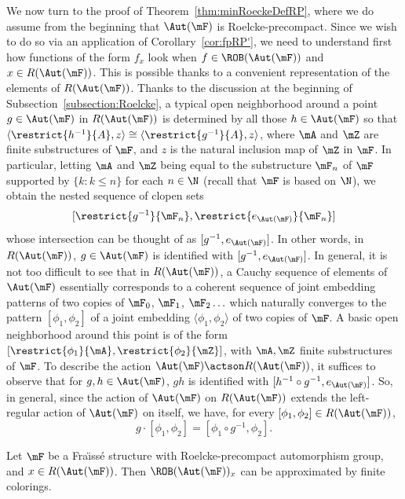 We now turn to the proof of Theorem~\ref{thm:minRoeckeDefRP}, where we do assume from the beginning that $\Aut(\mF)$ is Roelcke-precompact. Since we wish to do so via an application of Corollary~\ref{cor:fpRP'}, we need to understand first how functions of the form $f_{x}$ look when $f\in \ROB(\Aut(\mF))$ and $x\in R(\Aut(\mF))$. This is possible thanks to a convenient representation of the elements of $R(\Aut(\mF))$. Thanks to the discussion at the beginning of Subsection~\ref{subsection:Roelcke}, a typical open neighborhood around a point $g\in \Aut(\mF)$ in $R(\Aut(\mF))$ is determined by all those $h\in \Aut(\mF)$ so that $\langle \restrict{h^{-1}}{A}, z \rangle \cong \langle \restrict{g^{-1}}{A}, z \rangle$, where $\mA$ and $\mZ$ are finite substructures of $\mF$, and $z$ is the natural inclusion map of $\mZ$ in $\mF$. In particular, letting $\mA$ and $\mZ$ being equal to the substructure $\mF_{n}$ of $\mF$ supported by $\{ k : k\leq n\}$ for each $n\in \N$ (recall that $\mF$ is based on $\N$), we obtain the nested sequence of clopen sets
\[
[\restrict{g^{-1}}{\mF_{n}}, \restrict{e_{\Aut(\mF)}}{\mF_{n}}]
\]
whose intersection can be thought of as $[g^{-1},e_{\Aut(\mF)}]$. In other words, in $R(\Aut(\mF))$, $g\in \Aut(\mF)$ is identified with $[g^{-1},e_{\Aut(\mF)}]$. In general, it is not too difficult to see that in $R(\Aut(\mF))$, a Cauchy sequence of elements of $\Aut(\mF)$ essentially corresponds to a coherent sequence of joint embedding patterns of two copies of $\mF_{0}$, $\mF_{1}$, $\mF_{2}\ldots$ which naturally converges to the pattern $[\phi_{1},\phi_{2}]$ of a joint embedding $\langle\phi_{1},\phi_{2}\rangle$ of two copies of $\mF$. A basic open neighborhood around this point is of the form $[\restrict{\phi_{1}}{\mA},\restrict{\phi_{2}}{\mZ}]$, with $\mA, \mZ$ finite substructures of $\mF$. To describe the action $\Aut(\mF)\actson R(\Aut(\mF))$, it suffices to observe that for $g, h\in \Aut(\mF)$, $gh$ is identified with $[h^{-1}\circ g^{-1},e_{\Aut(\mF)}]$. So, in general, since the action of $\Aut(\mF)$ on $R(\Aut(\mF))$ extends the left-regular action of $\Aut(\mF)$ on itself, we have, for every $[\phi_{1},\phi_{2}]\in R(\Aut(\mF))$,
\[
g\cdot[\phi_{1},\phi_{2}] = [\phi_{1}\circ g^{-1},\phi_{2}].
\]


\begin{prop}
Let $\mF$ be a Fra\"{\i}ss\'e structure with Roelcke-precompact automorphism group, and $x\in R(\Aut(\mF))$. Then $\ROB(\Aut(\mF))_{x}$ can be approximated by finite colorings.
\end{prop}

